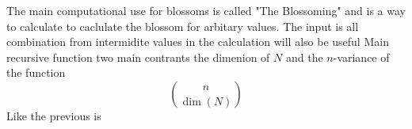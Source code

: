 
The main computational use for blossoms is called "The Blossoming" and is a way to calculate to caclulate the blossom for arbitary values.
The input is all combination from 
intermidite values in the calculation will also be useful
Main recursive function
two main contrants the dimenion of $N$ and the $n$-variance of the function
\[\binom{n}{\dim(N)}\]
Like the previous is 
